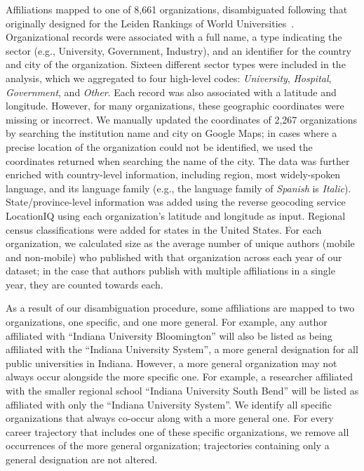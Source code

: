 \documentclass[12pt]{article} %
\begin{document}
Affiliations mapped to one of 8,661 organizations, disambiguated following that originally designed for the Leiden Rankings of World Universities~\autocite{waltman2012leidenrankings}.
Organizational records were associated with a full name, a type indicating the sector (e.g., University, Government, Industry), and an identifier for the country and city of the organization.
Sixteen different sector types were included in the analysis, which we aggregated to four high-level codes: \textit{University}, \textit{Hospital}, \textit{Government}, and \textit{Other}.
Each record was also associated with a latitude and longitude. 
However, for many organizations, these geographic coordinates were missing or incorrect. 
We manually updated the coordinates of 2,267 organizations by searching the institution name and city on Google Maps;
in cases where a precise location of the organization could not be identified, we used the coordinates returned when searching the name of the city.
The data was further enriched with country-level information, including region, most widely-spoken language, and its language family (e.g., the language family of \textit{Spanish} is \textit{Italic}).
State/province-level information was added using the reverse geocoding service LocationIQ using each organization's latitude and longitude as input.
Regional census classifications were added for states in the United States.
For each organization, we calculated size as the average number of unique authors (mobile and non-mobile) who published with that organization across each year of our dataset;
in the case that authors publish with multiple affiliations in a single year, they are counted towards each.


As a result of our disambiguation procedure, some affiliations are mapped to two organizations, one specific, and one more general.
For example, any author affiliated with ``Indiana University Bloomington'' will also be listed as being affiliated with the ``Indiana University System'', a more general designation for all public universities in Indiana.
However, a more general organization may not always occur alongside the more specific one.
For example, a researcher affiliated with the smaller regional school ``Indiana University South Bend'' will be listed as affiliated with only the ``Indiana University System''.
We identify all specific organizations that always co-occur along with a more general one.
For every career trajectory that includes one of these specific organizations, we remove all occurrences of the more general organization;
trajectories containing only a general designation are not altered.
\end{document}
